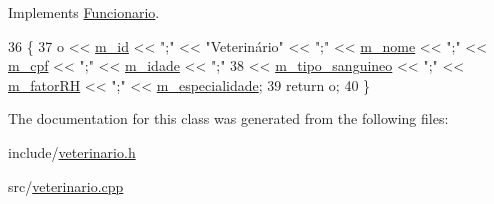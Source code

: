 Implements \hyperlink{classFuncionario_a06bb354ea21c7059a9740a6402f26b5c}{Funcionario}.


\begin{DoxyCode}
36 \{
37     o << \hyperlink{classFuncionario_a123c4af00e4e6eea5d4d9366a8bfefed}{m\_id} << \textcolor{stringliteral}{";"} << \textcolor{stringliteral}{"Veterinário"} << \textcolor{stringliteral}{";"} << \hyperlink{classFuncionario_a09663cf1395c066ef8cd538ead0f1a10}{m\_nome} << \textcolor{stringliteral}{";"} << \hyperlink{classFuncionario_af367fc8ad2efde9527d1ed0455560690}{m\_cpf} << \textcolor{stringliteral}{";"} << 
      \hyperlink{classFuncionario_a2bc5a68aebcf1a792812430ce5c8bdca}{m\_idade} << \textcolor{stringliteral}{";"}
38     << \hyperlink{classFuncionario_a89037092e620b92e1e8e305de50cb2d9}{m\_tipo\_sanguineo} << \textcolor{stringliteral}{";"} << \hyperlink{classFuncionario_ae9e77a47e6604c3d981de2e868619b6d}{m\_fatorRH} << \textcolor{stringliteral}{";"} << 
      \hyperlink{classFuncionario_a501682f1767cc891f9908ebc42e9e186}{m\_especialidade};
39     \textcolor{keywordflow}{return} o;
40 \}\end{DoxyCode}


The documentation for this class was generated from the following files\+:\begin{DoxyCompactItemize}
\item 
include/\hyperlink{veterinario_8h}{veterinario.\+h}\item 
src/\hyperlink{veterinario_8cpp}{veterinario.\+cpp}\end{DoxyCompactItemize}
